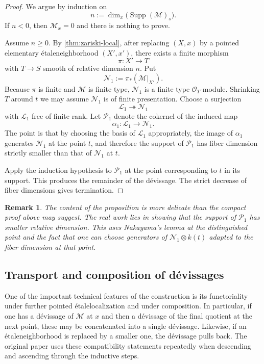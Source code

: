 \documentclass[11pt,oneside]{article}
\newtheorem{remark}[theorem]{Remark}
\newcommand{\Lcal}{\mathcal L}
\newcommand{\M}{\mathcal M}
\newcommand{\N}{\mathcal N}
\newcommand{\Pcal}{\mathcal P}
\newcommand{\OO}{\mathcal O}
\newcommand{\Supp}{\operatorname{Supp}}
\newcommand{\etale}{\'etale}
\begin{document}
\begin{proof}
We argue by induction on
\[
n:=\dim_x\bigl(\Supp(\M)_s\bigr).
\]
If $n<0$, then $\M_x=0$ and there is nothing to prove.

Assume $n\ge 0$.  By \cref{thm:zariski-local}, after replacing $(X,x)$ by a pointed elementary \etale neighborhood $(X',x')$, there exists a finite morphism
\[
\pi\colon X'\to T
\]
with $T\to S$ smooth of relative dimension $n$.  Put
\[
\N_1:=\pi_*(\M|_{X'}).
\]
Because $\pi$ is finite and $\M$ is finite type, $\N_1$ is a finite type $\OO_T$-module.  Shrinking $T$ around $t$ we may assume $\N_1$ is of finite presentation.  Choose a surjection
\[
\Lcal_1\twoheadrightarrow \N_1
\]
with $\Lcal_1$ free of finite rank.  Let $\Pcal_1$ denote the cokernel of the induced map
\[
\alpha_1\colon \Lcal_1\to \N_1.
\]
The point is that by choosing the basis of $\Lcal_1$ appropriately, the image of $\alpha_1$ generates $\N_1$ at the point $t$, and therefore the support of $\Pcal_1$ has fiber dimension strictly smaller than that of $\N_1$ at $t$.

Apply the induction hypothesis to $\Pcal_1$ at the point corresponding to $t$ in its support.  This produces the remainder of the d\'evissage.  The strict decrease of fiber dimensions gives termination.
\end{proof}

\begin{remark}
The content of the proposition is more delicate than the compact proof above may suggest.  The real work lies in showing that the support of $\Pcal_1$ has smaller relative dimension.  This uses Nakayama's lemma at the distinguished point and the fact that one can choose generators of $\N_1\otimes k(t)$ adapted to the fiber dimension at that point.
\end{remark}

\subsection{Transport and composition of d\'evissages}

One of the important technical features of the construction is its functoriality under further pointed \etale localization and under composition.  In particular, if one has a d\'evissage of $\M$ at $x$ and then a d\'evissage of the final quotient at the next point, these may be concatenated into a single d\'evissage.  Likewise, if an \etale neighborhood is replaced by a smaller one, the d\'evissage pulls back.  The original paper uses these compatibility statements repeatedly when descending and ascending through the inductive steps.
\end{document}
